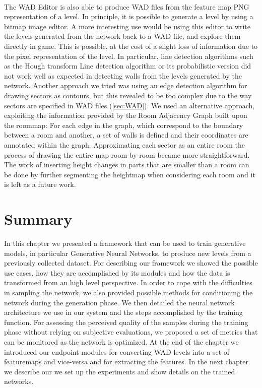 \paragraph{} The WAD Editor is also able to produce WAD files from the feature map PNG representation of a level. In principle, it is possible to generate a level by  using a bitmap image editor. A more interesting use would be using this editor to write the levels generated from the network back to a WAD file, and explore them directly in game. This is possible, at the cost of a slight loss of information due to the pixel representation of the level. In particular, line detection algorithms such as the Hough transform Line detection algorithm \cite{hough} or its probabilistic version \cite{houghprob} did not work well as expected in detecting walls from the levels generated by the network. Another approach we tried was using an edge detection algorithm for drawing sectors as contours, but this revealed to be too complex due to the way sectors are specified in WAD files (\ref{sec:WAD}). We used an alternative approach, exploiting the information provided by the Room Adjacency Graph built upon the \gls{roommap}: For each edge in the graph, which correspond to the boundary between a room and another, a set of walls is defined and their coordinates are annotated within the graph. Approximating each sector as an entire room the process of drawing the entire map room-by-room became more straightforward. The work of inserting height changes in parts that are smaller than a room can be done by further segmenting the heightmap when considering each room and it is left as a future work.

\section{Summary} 
In this chapter we presented a framework that can be used to train generative models, in particular Generative Neural Networks, to produce new levels from a previously collected dataset. For describing our framework we showed the possible use cases, how they are accomplished by its modules and how the data is transformed from an high level perspective. In order to cope with the difficulties in sampling the network, we also provided possible methods for conditioning the network during the generation phase. We then detailed the neural network architecture we use in our system and the steps accomplished by the training function. For assessing the perceived quality of the samples during the training phase without relying on subjective evaluations, we proposed a set of metrics that can be monitored as the network is optimized. At the end of the chapter we introduced our endpoint modules for converting WAD levels into a set of \glspl{featuremap} and vice-versa and for extracting the features. In the next chapter we describe our we set up the experiments and show details on the trained networks.